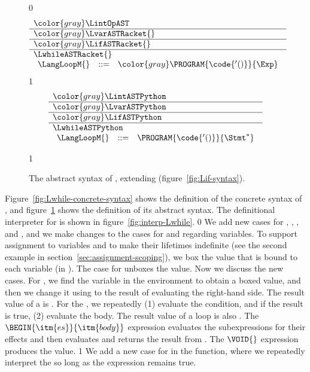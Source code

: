\documentclass[7x10]{TimesAPriori_MIT}%
\newcommand{\gray}[1]{{\color{gray} #1}}
\def\racketEd{0}
\def\pythonEd{1}
\def\edition{1}
\newcommand{\pythonColor}[0]{}
\newcommand{\python}[1]{{\if\edition\pythonEd\pythonColor #1\fi}}
\numberwithin{theorem}{chapter}
\numberwithin{definition}{chapter}
\numberwithin{equation}{chapter}
\begin{document}
\begin{figure}[tp]
\centering
\begin{tcolorbox}[colback=white]
    \small
{\if\edition\racketEd    
\[
\begin{array}{l}
  \gray{\LintOpAST} \\ \hline
  \gray{\LvarASTRacket{}} \\ \hline
  \gray{\LifASTRacket{}} \\ \hline
  \LwhileASTRacket{} \\
\begin{array}{lcl}
  \LangLoopM{} &::=& \gray{ \PROGRAM{\code{'()}}{\Exp} }
\end{array}
\end{array}
\]
\fi}
{\if\edition\pythonEd\pythonColor
\[
\begin{array}{l}
  \gray{\LintASTPython} \\ \hline
  \gray{\LvarASTPython}  \\ \hline
  \gray{\LifASTPython} \\ \hline
  \LwhileASTPython \\
\begin{array}{lcl}
\LangLoopM{} &::=& \PROGRAM{\code{'()}}{\Stmt^{*}}
\end{array}
\end{array}
\]
\fi}
\end{tcolorbox}
\python{
  }
\caption{The abstract syntax of \LangLoop{}, extending \LangIf{} (figure~\ref{fig:Lif-syntax}).}
\label{fig:Lwhile-syntax}
\end{figure}

Figure~\ref{fig:Lwhile-concrete-syntax} shows the definition of the
concrete syntax of \LangLoop{}, and figure~\ref{fig:Lwhile-syntax}
shows the definition of its abstract syntax.
%
The definitional interpreter for \LangLoop{} is shown in
figure~\ref{fig:interp-Lwhile}.
%
{\if\edition\racketEd    
%
We add new cases for , , ,
and , and we make changes to the cases for  and
 regarding variables. To support assignment to variables and
to make their lifetimes indefinite (see the second example in
section~\ref{sec:assignment-scoping}), we box the value that is bound
to each variable (in ). The case for  unboxes the
value.
%
Now we discuss the new cases. For , we find the
variable in the environment to obtain a boxed value, and then we change
it using  to the result of evaluating the right-hand
side.  The result value of a  is .
%
For the , we repeatedly (1) evaluate the condition, and
if the result is true, (2) evaluate the body.
The result value of a  loop is also .
%
The $\BEGIN{\itm{es}}{\itm{body}}$ expression evaluates the
subexpressions  for their effects and then evaluates
and returns the result from .
%
The $\VOID{}$ expression produces the  value.
%
\fi}
{\if\edition\pythonEd\pythonColor
%
We add a new case for  in the 
function, where we repeatedly interpret the  so long as the
 expression remains true.
%
\fi}
\end{document}
